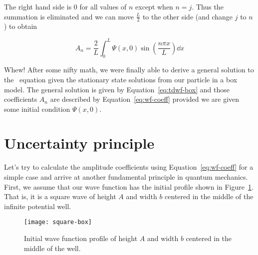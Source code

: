 The right hand side is 0 for all values of $n$ except when $n=j$. Thus the summation is eliminated and we can move $\frac{L}{2}$ to the other side (and change $j$ to $n$) to obtain
\begin{tcolorbox}[title = Wave function expansion coefficients] \vspace{-2ex}
	\begin{equation}
		A_n = \frac{2}{L} \int_0^L \Psi(x,0) \sin \left(\frac{n\pi x}{L}\right) \dd{x} \label{eq:wf-coeff}
	\end{equation}
\end{tcolorbox}

Whew! After some nifty math, we were finally able to derive a general solution to the \Sch\ equation given the stationary state solutions from our particle in a box model. The general solution is given by Equation~\ref{eq:tdwf-box} and those coefficients $A_n$ are described by Equation~\ref{eq:wf-coeff} provided we are given some initial condition $\Psi(x,0)$.


\section{Uncertainty principle}
Let's try to calculate the amplitude coefficients using Equation~\ref{eq:wf-coeff} for a simple case and arrive at another fundamental principle in quantum mechanics. First, we assume that our wave function has the initial profile shown in Figure~\ref{fig:square-box}. That is, it is a square wave of height $A$ and width $b$ centered in the middle of the infinite potential well.

\begin{figure}[!h]
	\centering
	\texttt{[image: square-box]}
	\caption{Initial wave function profile of height $A$ and width $b$ centered in the middle of the well.}
	\label{fig:square-box}
\end{figure}

